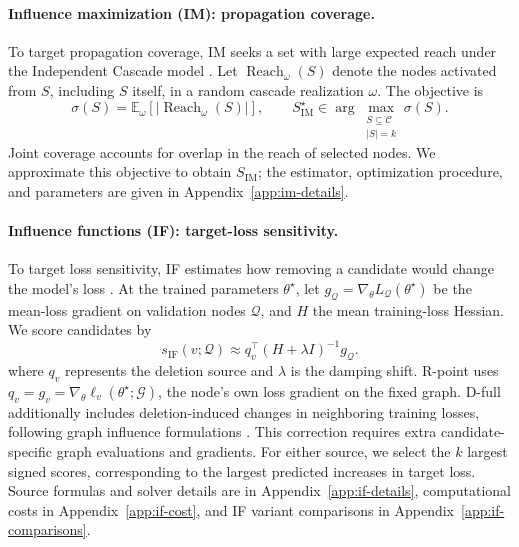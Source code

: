 \paragraph{Influence maximization (IM): propagation coverage.}
To target propagation coverage, IM seeks a set with large expected reach under the Independent Cascade model \citep{kempe2003maximizing}. Let $\operatorname{Reach}_{\omega}(S)$ denote the nodes activated from $S$, including $S$ itself, in a random cascade realization $\omega$. The objective is
\begin{equation}
\sigma(S)=\mathbb{E}_{\omega}\!\left[|\operatorname{Reach}_{\omega}(S)|\right],
\qquad
S_{\mathrm{IM}}^\star\in
\arg\max_{\substack{S\subseteq\mathcal C\\ |S|=k}}\sigma(S).
\label{eq:im-objective}
\end{equation}
Joint coverage accounts for overlap in the reach of selected nodes. We approximate this objective to obtain $S_{\mathrm{IM}}$; the estimator, optimization procedure, and parameters are given in Appendix~\ref{app:im-details}.

\paragraph{Influence functions (IF): target-loss sensitivity.}
To target loss sensitivity, IF estimates how removing a candidate would change the model's loss \citep{koh2017understanding}. At the trained parameters $\theta^\star$, let $g_{\mathcal Q}=\nabla_\theta L_{\mathcal Q}(\theta^\star)$ be the mean-loss gradient on validation nodes $\mathcal Q$, and $H$ the mean training-loss Hessian. We score candidates by
\begin{equation}
s_{\mathrm{IF}}(v;\mathcal Q)\approx
q_v^\top(H+\lambda I)^{-1}g_{\mathcal Q}.
\label{eq:if-score}
\end{equation}
where $q_v$ represents the deletion source and $\lambda$ is the damping shift. R-point uses $q_v=g_v=\nabla_\theta\ell_v(\theta^\star;\mathcal G)$, the node's own loss gradient on the fixed graph. D-full additionally includes deletion-induced changes in neighboring training losses, following graph influence formulations \citep{wu2023gif,chen2023characterizing}. This correction requires extra candidate-specific graph evaluations and gradients. For either source, we select the $k$ largest signed scores, corresponding to the largest predicted increases in target loss. Source formulas and solver details are in Appendix~\ref{app:if-details}, computational costs in Appendix~\ref{app:if-cost}, and IF variant comparisons in Appendix~\ref{app:if-comparisons}.

